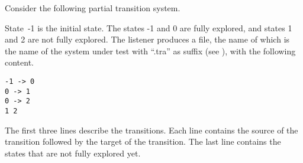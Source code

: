 \documentclass[12pt]{article}
\theoremstyle{definition}
\begin{document}
Consider the following partial transition system.
\begin{center}
\end{center}
State~-1 is the initial state.  The states -1 and 0 are fully explored, and  states 1 and 2 are not fully explored.  The listener produces a file, the name of which is the name of the system under test with ``.tra'' as suffix (see \cite[Section 7.4]{B20}), with the following content.
\begin{verbatim}
-1 -> 0
0 -> 1
0 -> 2
1 2
\end{verbatim}
The first three lines describe the transitions.  Each line contains the source of the transition followed by the target of the transition.  The last line contains the states that are not fully explored yet.



\end{document}
